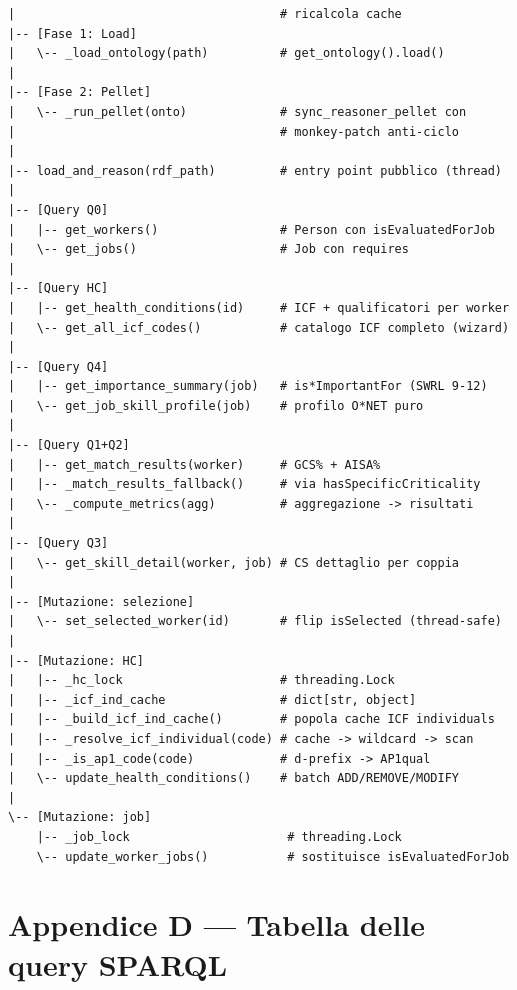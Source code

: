 \documentclass[a4paper,12pt]{article}
\begin{document}
\begin{lstlisting}[caption={Pseudo-outline di \texttt{reasoner.py}.}, numbers=none]
|                                     # ricalcola cache
|-- [Fase 1: Load]
|   \-- _load_ontology(path)          # get_ontology().load()
|
|-- [Fase 2: Pellet]
|   \-- _run_pellet(onto)             # sync_reasoner_pellet con
|                                     # monkey-patch anti-ciclo
|
|-- load_and_reason(rdf_path)         # entry point pubblico (thread)
|
|-- [Query Q0]
|   |-- get_workers()                 # Person con isEvaluatedForJob
|   \-- get_jobs()                    # Job con requires
|
|-- [Query HC]
|   |-- get_health_conditions(id)     # ICF + qualificatori per worker
|   \-- get_all_icf_codes()           # catalogo ICF completo (wizard)
|
|-- [Query Q4]
|   |-- get_importance_summary(job)   # is*ImportantFor (SWRL 9-12)
|   \-- get_job_skill_profile(job)    # profilo O*NET puro
|
|-- [Query Q1+Q2]
|   |-- get_match_results(worker)     # GCS% + AISA%
|   |-- _match_results_fallback()     # via hasSpecificCriticality
|   \-- _compute_metrics(agg)         # aggregazione -> risultati
|
|-- [Query Q3]
|   \-- get_skill_detail(worker, job) # CS dettaglio per coppia
|
|-- [Mutazione: selezione]
|   \-- set_selected_worker(id)       # flip isSelected (thread-safe)
|
|-- [Mutazione: HC]
|   |-- _hc_lock                      # threading.Lock
|   |-- _icf_ind_cache                # dict[str, object]
|   |-- _build_icf_ind_cache()        # popola cache ICF individuals
|   |-- _resolve_icf_individual(code) # cache -> wildcard -> scan
|   |-- _is_ap1_code(code)            # d-prefix -> AP1qual
|   \-- update_health_conditions()    # batch ADD/REMOVE/MODIFY
|
\-- [Mutazione: job]
    |-- _job_lock                      # threading.Lock
    \-- update_worker_jobs()           # sostituisce isEvaluatedForJob
\end{lstlisting}

\section*{Appendice D --- Tabella delle query SPARQL}
\end{document}

